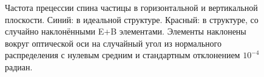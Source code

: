 \documentclass{article}
\begin{document}
	\begin{figure}[htb]\ContinuedFloat
		\caption{Частота прецессии спина частицы в горизонтальной и вертикальной плоскости. Синий: в идеальной структуре. Красный: в структуре, со случайно наклонёнными E+B элементами. Элементы наклонены вокруг оптической оси на случайный угол из нормального распределения с нулевым средним и стандартным отклонением $10^{-4}$ радиан.\label{fig:cross_plot}}
	\end{figure}
\end{document}

